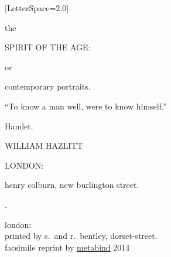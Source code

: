 \begingroup%
\thispagestyle{empty}

\setlength{\epigraphwidth}{0.7\textwidth}
\epigraphfontsize{\footnotesize}
\setlength{\epigraphrule}{0pt}

\fontspec{\millerdsc}[LetterSpace=2.0]

\centering

\begingroup %

{\Large the} \par
{}

{\HUGE \mdseries SPIRIT OF THE AGE:} \par
{}

{\large or} \par
{}

{\Huge \mdseries contemporary portraits.} \par
{}

\epigraph{
\enquote{To know a man well, were to know himself.}
}{\textmd{Hamlet.}} \par
{}

{\Large \mdseries WILLIAM HAZLITT} \par
{}

\begin{DoubleSpace}
{\large \mdseries LONDON:} \par
{\large \mdseries henry colburn, new burlington street.} \par
{\large {}.}
\end{DoubleSpace}

\endgroup %

\cleartoverso

\begingroup%
\thispagestyle{empty}
\vspace*{0.75\textheight}
\begin{DoubleSpace}
{\mdseries london:}\\
{\mdseries printed by s.\ and r.\ bentley, dorset-street.}\\
{\footnotesize \mdseries facsimile reprint by
  \href{http://metabind.artworks.studio}{metabind} 2014}
\end{DoubleSpace}
\endgroup%

\endgroup%
\clearpage